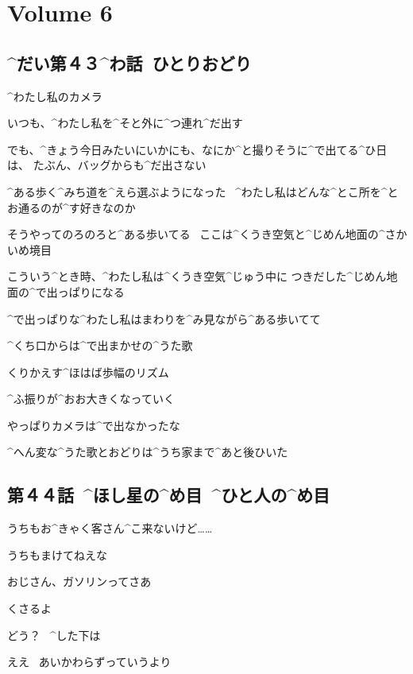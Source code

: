 \section{Volume 6}

\subsection{^{だい}{第}４３^{わ}{話}\ ひとりおどり}

\page[2]
\Alpha ^{わたし}{私}のカメラ

\Alpha いつも、^{わたし}{私}を^{そと}{外}に^{つ}{連}れ^{だ}{出}す

\page[3]
\Alpha でも、^{きょう}{今日}みたいにいかにも、なにか^{と}{撮}りそうに^{で}{出}てる^{ひ}{日}は、
たぶん、バッグからも^{だ}{出}さない

\page[4]
\Alpha ^{ある}{歩}く^{みち}{道}を^{えら}{選}ぶようになった
\ ^{わたし}{私}はどんな^{とこ}{所}を^{とお}{通}るのが^{す}{好}きなのか

\Alpha そうやってのろのろと^{ある}{歩}いてる
\ ここは^{くうき}{空気}と^{じめん}{地面}の^{さかいめ}{境目}

\page[5]
\Alpha こういう^{とき}{時}、^{わたし}{私}は^{くうき}{空気}^{じゅう}{中}に
つきだした^{じめん}{地面}の^{で}{出}っぱりになる

\page[6]
\Alpha ^{で}{出}っぱりな^{わたし}{私}はまわりを^{み}{見}ながら^{ある}{歩}いてて

\Alpha ^{くち}{口}からは^{で}{出}まかせの^{うた}{歌}

\Alpha くりかえす^{ほはば}{歩幅}のリズム

\Alpha ^{ふ}{振}りが^{おお}{大}きくなっていく

\page[8]
\Alpha やっぱりカメラは^{で}{出}なかったな

\Alpha ^{へん}{変}な^{うた}{歌}とおどりは^{うち}{家}まで^{あと}{後}ひいた


\subsection{第４４話\ ^{ほし}{星}の^{め}{目}\ ^{ひと}{人}の^{め}{目}}

\page[11]
\Alpha うちもお^{きゃく}{客}さん^{こ}{来}ないけど……

\Ojisan うちもまけてねえな

\Alpha おじさん、ガソリンってさあ

\Ojisan くさるよ

\page[15]
\Person どう？
\ ^{した}{下}は

\page[16]
\ASevenMOne ええ
\ あいかわらずっていうより

